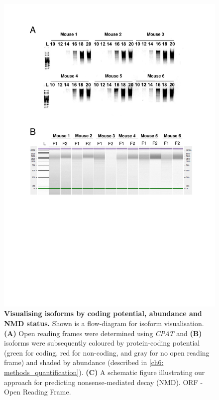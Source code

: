 \begin{figure}[htp]
	\centering
	\includegraphics[page=8,trim={0cm 1cm 0cm 0cm},clip,scale = 0.75]{Figures/TargetedTranscriptome_LabResults}
	\captionsetup{width=0.95\textwidth,singlelinecheck=off}
	\caption[Visualising isoforms by coding potential, abundance and NMD status]%
	{\textbf{Visualising isoforms by coding potential, abundance and NMD status.} Shown is a flow-diagram for isoform visualisation. \textbf{(A)} Open reading frames were determined using \textit{CPAT} and \textbf{(B)} isoforms were subsequently coloured by protein-coding potential (green for coding, red for non-coding, and gray for no open reading frame) and shaded by abundance (described in \cref{ch6: methods_quantification}). \textbf{(C)} A schematic figure illustrating our approach for predicting nonsense-mediated decay (NMD). ORF - Open Reading Frame. 
	}
	\label{fig:Targeted_isoforms_cpat}
\end{figure}


